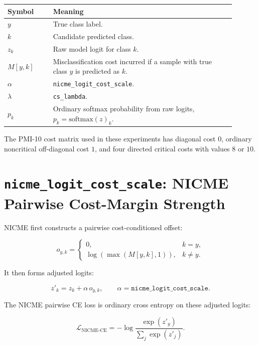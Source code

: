\documentclass[11pt]{article}
\newcommand{\code}[1]{\texttt{#1}}
\begin{document}
\begin{center}
\begin{tabular}{>{\raggedright\arraybackslash}p{0.18\linewidth} p{0.72\linewidth}}
\toprule
Symbol & Meaning \\
\midrule
$y$ & True class label. \\
$k$ & Candidate predicted class. \\
$z_k$ & Raw model logit for class $k$. \\
$M[y,k]$ & Misclassification cost incurred if a sample with true class $y$ is predicted as $k$. \\
$\alpha$ & \code{nicme\_logit\_cost\_scale}. \\
$\lambda$ & \code{cs\_lambda}. \\
$p_k$ & Ordinary softmax probability from raw logits, $p_k=\mathrm{softmax}(z)_k$. \\
\bottomrule
\end{tabular}
\end{center}

The PMI-10 cost matrix used in these experiments has diagonal cost $0$, ordinary noncritical off-diagonal cost $1$, and four directed critical costs with values $8$ or $10$.

\section{\code{nicme\_logit\_cost\_scale}: NICME Pairwise Cost-Margin Strength}

NICME first constructs a pairwise cost-conditioned offset:

\begin{equation}
o_{y,k} =
\begin{cases}
0, & k=y,\\
\log\left(\max(M[y,k], 1)\right), & k \neq y.
\end{cases}
\end{equation}

It then forms adjusted logits:

\begin{equation}
z'_k = z_k + \alpha \, o_{y,k},
\qquad
\alpha = \code{nicme\_logit\_cost\_scale}.
\end{equation}

The NICME pairwise CE loss is ordinary cross entropy on these adjusted logits:

\begin{equation}
\mathcal{L}_{\mathrm{NICME\text{-}CE}}
=
-\log
\frac{\exp(z'_y)}
{\sum_j \exp(z'_j)}.
\end{equation}
\end{document}

